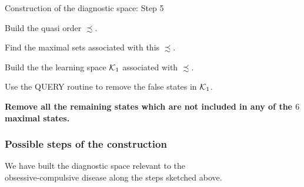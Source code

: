 \documentclass{beamer}
\def\KKK{{\cal K}}
\begin{document}
\begin{frame}{Construction of the diagnostic space: Step 5}
\center
\begin{minipage}{11cm} 
\begin{roster}
\item[1.]   Build the quasi order $\precsim$.
\item[2.]   Find the maximal sets associated with this $\precsim$. 
\item[3.]   Build the the learning space $\KKK_1$ associated with $\precsim$.
\item[4.]  Use the {\sc QUERY} routine to remove the false states in $\KKK_1$.
\item[5.] {\bf Remove all the remaining states which are not included in any of the $6$ maximal states.}   
\end{roster}
\end{minipage}
 \vspace{.5cm}

\end{frame}
\begin{frame}
\frametitle{Possible steps of the construction}
\center
\begin{minipage}{10.5cm} We have built the diagnostic space relevant to the\\ obsessive-compulsive disease  along the steps sketched above.
\end{minipage}
 \vspace{.5cm}

\end{frame}
\end{document}
